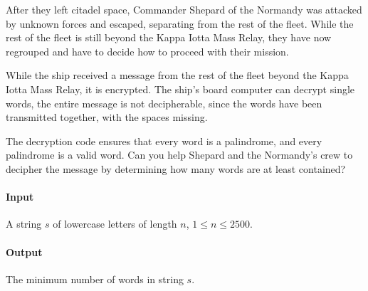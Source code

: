



\makeheader

After they left citadel space, Commander Shepard of the Normandy was attacked by unknown forces and escaped, separating from the rest of the fleet. While the rest of the fleet is still beyond the Kappa Iotta Mass Relay, they have now regrouped and have to decide how to proceed with their mission.

While the ship received a message from the rest of the fleet beyond the Kappa Iotta Mass Relay, it is encrypted. The ship's board computer can decrypt single words, the entire message is not decipherable, since the words have been transmitted together, with the spaces missing.

The decryption code ensures that every word is a palindrome, and every palindrome is a valid word. Can you help Shepard and the Normandy's crew to decipher the message by determining how many words are at least contained?

\paragraph*{Input}

A string $s$ of lowercase letters of length $n$, $1 \le n \le 2500$.

\paragraph*{Output}

The minimum number of words in string $s$.

\begin{samples}
\end{samples}

